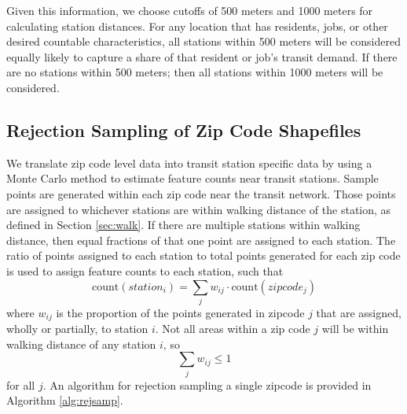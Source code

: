\documentclass[11pt]{article}
\begin{document}
Given this information, we choose cutoffs of 500 meters and 1000 meters for calculating station distances. For any location that has residents, jobs, or other desired countable characteristics, all stations within 500 meters will be considered equally likely to capture a share of that resident or job's transit demand. If there are no stations within 500 meters; then all stations within 1000 meters will be considered. 

\subsection{Rejection Sampling of Zip Code Shapefiles}\label{sec:sampling}

We translate zip code level data into transit station specific data by using a Monte Carlo method to estimate feature counts near transit stations. Sample points are generated within each zip code near the transit network. Those points are assigned to whichever stations are within walking distance of the station, as defined in Section \ref{sec:walk}. If there are multiple stations within walking distance, then equal fractions of that one point are assigned to each station. The ratio of points assigned to each station to total points generated for each zip code is used to assign feature counts to each station, such that
\[\text{count}(station_i) = \sum_j w_{ij} \cdot \text{count}(zipcode_j)\]
where $w_{ij}$ is the proportion of the points generated in zipcode $j$ that are assigned, wholly or partially, to station $i$. Not all areas within a zip code $j$ will be within walking distance of any station $i$, so 
\[\sum_j w_{ij} \leq 1\] for all $j$. An algorithm for rejection sampling a single zipcode is provided in Algorithm \ref{alg:rejsamp}.
\end{document}
